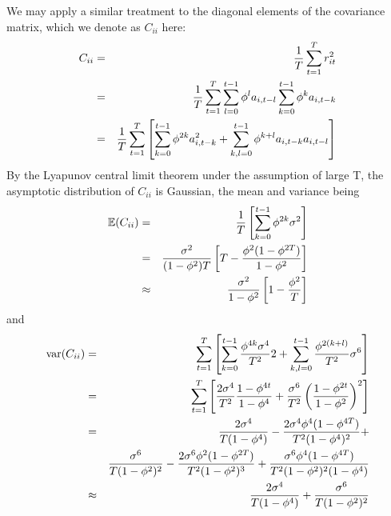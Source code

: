
We may apply a similar treatment to the diagonal elements of the
covariance matrix, which we denote as $C_{ii}$ here:
\begin{eqnarray*}
  C_{ii} &=& {1 \over T} \sum_{t=1}^T r^2_{it} \\
  &=& {1 \over T} \sum_{t=1}^T \sum_{l=0}^{t-1}\phi^l a_{i, t-l}
  \sum_{k=0}^{t-1}\phi^k a_{i, t-k} \\
  &=& {1 \over T} \sum_{t=1}^T \left[
    \sum_{k=0}^{t-1} \phi^{2k} a^2_{i, t-k} +
    \sum_{k,l = 0}^{t-1} \phi^{k+l} a_{i, t-k} a_{i, t-l}
  \right]
\end{eqnarray*}
By the Lyapunov central limit theorem under the assumption of large T,
the asymptotic distribution of $C_{ii}$ is Gaussian, the mean and
variance being
\begin{eqnarray}
  \mathbb{E}(C_{ii}) &=& {1 \over T}\left[
    \sum_{k=0}^{t-1} \phi^{2k} \sigma^2
  \right] \nonumber \\
  &=& {\sigma^2 \over (1 - \phi^2) T} \left[
    T - {\phi^2 (1 - \phi^{2T}) \over 1 - \phi^2}
  \right] \nonumber \\
  & \approx & {\sigma^2 \over 1 - \phi^2} \left[
    1 - {\phi^2 \over T}
  \right] \label{eq:gaussian_cii_mean}
\end{eqnarray}
and
\begin{eqnarray}
  \text{var}(C_{ii}) &=& \sum_{t=1}^T \left[
    \sum_{k=0}^{t-1} {\phi^{4k} \sigma^4 \over T^2} 2 +
    \sum_{k,l=0}^{t-1} {\phi^{2(k+l)} \over T^2} \sigma^6
  \right] \nonumber \\
  &=& \sum_{t=1}^T \left[
    {2 \sigma^4 \over T^2} {1 - \phi^{4t} \over 1 - \phi^4} +
    {\sigma^6 \over T^2} \left(
      {1 - \phi^{2t} \over 1- \phi^2}
    \right)^2 \right] \nonumber \\
  &=& {2 \sigma^4 \over T (1 - \phi^4)} -
  {2 \sigma^4 \phi^4 (1 - \phi^{4T}) \over T^2(1 - \phi^4)^2} +
  \nonumber \\
  && {\sigma^6 \over T (1 -\phi^2)^2} -
  {2 \sigma^6 \phi^2 (1 - \phi^{2T}) \over T^2 (1 - \phi^2)^3} +
  {\sigma^6 \phi^4 (1 - \phi^{4T}) \over T^2 (1 - \phi^2)^2 (1 -
    \phi^4)} \nonumber \\
  &\approx& {2 \sigma^4 \over T (1 - \phi^4)} + {\sigma^6 \over T (1
    -\phi^2)^2} \label{eq:gaussian_cii_variance}
\end{eqnarray}

